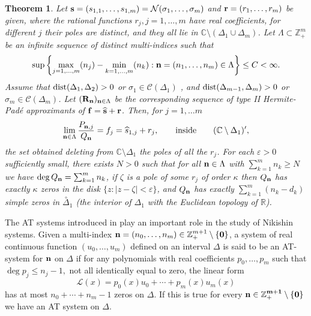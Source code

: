 \documentclass[10pt,a4paper]{article}
\newtheorem{theorem}{Theorem}[section]
\theoremstyle{definition}
\theoremstyle{remark}
\numberwithin{equation}{section}
\begin{document}
\begin{theorem}\label{TCTII}
Let ${\bf s} = (s_{1,1},\ldots,s_{1,m}) = \mathcal{N}(\sigma_1,\ldots,\sigma_m)$ and ${\bf r} = (r_1,\ldots,r_m)$ be given,  where the rational functions $r_j, j=1,\ldots,m$ have real coefficients, for different $j$ their poles are distinct, and they all lie in  ${\mathbb{C}}\setminus (\Delta_1 \cup \Delta_m)$. Let $\Lambda \subset \mathbb{Z}_+^{m}$ be an infinite sequence of distinct multi-indices  such that
\begin{equation}\label{cond1} \sup \left\{\max_{j=1,\ldots,m}(n_j) - \min_{k=1,\ldots,m}(n_k) : {\bf n} =(n_1,\ldots,n_m) \in \Lambda\right\} \leq C < \infty. \end{equation}
Assume that $\mbox{\rm dist}(\Delta_{1},\Delta_2) >0$  or $\sigma_1 \in \mathcal{C}(\Delta_1)$  , and $\mbox{\rm dist}(\Delta_{m-1},\Delta_m) >0$  or $\sigma_m \in \mathcal{C}(\Delta_m)$. Let $({\bf R}_{\bf n})_{{\bf n}\in \Lambda}$ be the corresponding sequence of type II Hermite-Pad\'e approximants of ${\bf f}= \widehat{\bf s} + {\bf r}$. Then, for $j=1,\ldots m$
\begin{equation} \label{convunif} \lim_{{\bf n}\in \Lambda}
\frac{P_{{\bf n},j}}{Q_{{\bf n}}} = f_j = \widehat{s}_{1,j} + r_j, \qquad \mbox{inside} \qquad (\mathbb{C}\setminus \Delta_{1})^{\prime},
\end{equation}
the set obtained deleting from $\mathbb{C}\setminus \Delta_{1} $ the poles of all the $r_j$. For each $\varepsilon > 0$ sufficiently small, there exists $N > 0$ such that for all  ${\bf n} \in \Lambda$ with $\sum_{k=1}^m n_k \geq N$ we have $\deg Q_{\bf n} = \sum_{k=1}^m n_k$, if $\zeta$ is a pole of some $r_j$ of order $\kappa$ then $Q_{\bf n}$ has exactly $\kappa$ zeros in the disk $\{z : |z-\zeta| < \varepsilon\}$, and $Q_{\bf n}$ has exactly $\sum_{k=1}^m (n_k-d_k) $ simple zeros in $\stackrel{\circ}{\Delta}_1 $ (the interior of $\Delta_1$ with the Euclidean topology of $\mathbb{R}$).
\end{theorem}

The AT systems introduced in \cite{Nik} play an important role in the study of Nikishin systems. Given a multi-index ${\bf n}=(n_0,\ldots, n_m) \in \mathbb{Z}_+^{m+1} \setminus \{\bf 0\}$, a system of real continuous function $(u_0,\ldots,u_m)$ defined on an interval $\Delta$ is said to be an AT-system for ${\bf n}$ on $\Delta$ if for any  polynomials with real coefficients $p_0,\ldots,p_m$ such that  $\deg p_j \leq n_j -1,$ not all identically equal to zero, the linear form
\[
 {\mathcal{L}}(x)=p_0(x)u_0+\cdots+p_m(x) u_m(x)
\]
has at most $n_0+\cdots+n_m -1$ zeros on $\Delta$. If this is true for every $\bf n \in {\mathbb{Z}}_+^{m+1}\setminus \{\bf 0\}$ we have an AT system on $\Delta$.
\end{document}

